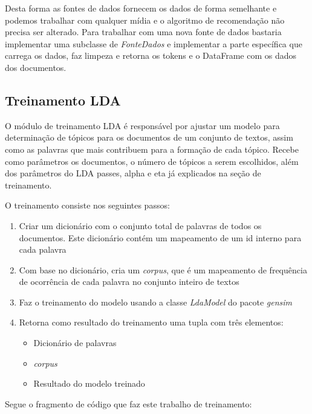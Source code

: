 Desta forma as fontes de dados fornecem os dados de forma semelhante e podemos trabalhar com qualquer mídia e o algoritmo de recomendação não precisa ser alterado.
Para trabalhar com uma nova fonte de dados bastaria implementar uma subclasse de \textit{FonteDados} e implementar a parte específica que carrega os dados, faz limpeza e retorna os tokens e o DataFrame com os dados dos documentos.

\subsection{Treinamento LDA}

O módulo de treinamento LDA é responsável por ajustar um modelo para determinação de tópicos para os documentos de um conjunto de textos, assim como as 
palavras que mais contribuem para a formação de cada tópico. Recebe como parâmetros os documentos, o número de tópicos a serem escolhidos, 
além dos parâmetros do LDA passes, alpha e eta já explicados na seção de treinamento.

O treinamento consiste nos seguintes passos:

\begin{enumerate}
    \item Criar um dicionário com o conjunto total de palavras de todos os documentos. Este dicionário contém um mapeamento de um id interno para cada palavra
    \item Com base no dicionário, cria um \textit{corpus}, que é um mapeamento de frequência de ocorrência de cada palavra no conjunto inteiro de textos
    \item Faz o treinamento do modelo usando a classe \textit{LdaModel} do pacote \textit{gensim}
    \item Retorna como resultado do treinamento uma tupla com três elementos:
    \begin{itemize}
        \item Dicionário de palavras
        \item \textit{corpus}
        \item Resultado do modelo treinado
    \end{itemize}
\end{enumerate}

Segue o fragmento de código que faz este trabalho de treinamento:
\vspace{3mm} %

